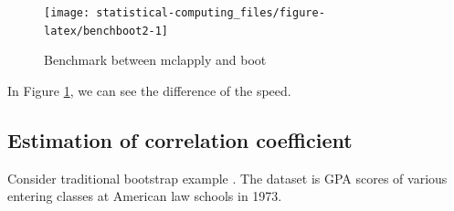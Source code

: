 \documentclass[]{book}
\newenvironment{Shaded}{\begin{snugshade}}{\end{snugshade}}
\newcommand{\ControlFlowTok}[1]{\textcolor[rgb]{0.13,0.29,0.53}{\textbf{#1}}}
\newcommand{\DataTypeTok}[1]{\textcolor[rgb]{0.13,0.29,0.53}{#1}}
\newcommand{\DecValTok}[1]{\textcolor[rgb]{0.00,0.00,0.81}{#1}}
\newcommand{\KeywordTok}[1]{\textcolor[rgb]{0.13,0.29,0.53}{\textbf{#1}}}
\newcommand{\NormalTok}[1]{#1}
\newcommand{\OperatorTok}[1]{\textcolor[rgb]{0.81,0.36,0.00}{\textbf{#1}}}
\newcommand{\StringTok}[1]{\textcolor[rgb]{0.31,0.60,0.02}{#1}}
\theoremstyle{definition}
\theoremstyle{definition}
\theoremstyle{definition}
\theoremstyle{remark}
\begin{document}
\begin{Shaded}
\end{Shaded}

\begin{figure}[H]

{\centering \texttt{[image: statistical-computing\_files/figure-latex/benchboot2-1]} 

}

\caption{Benchmark between mclapply and boot}\label{fig:benchboot2}
\end{figure}

In Figure \ref{fig:benchboot2}, we can see the difference of the speed.

\hypertarget{estimation-of-correlation-coefficient}{%
\subsection{Estimation of correlation coefficient}\label{estimation-of-correlation-coefficient}}

Consider traditional bootstrap example \citep{Efron:1983bw}. The dataset is GPA scores of various entering classes at American law schools in 1973.
\end{document}
